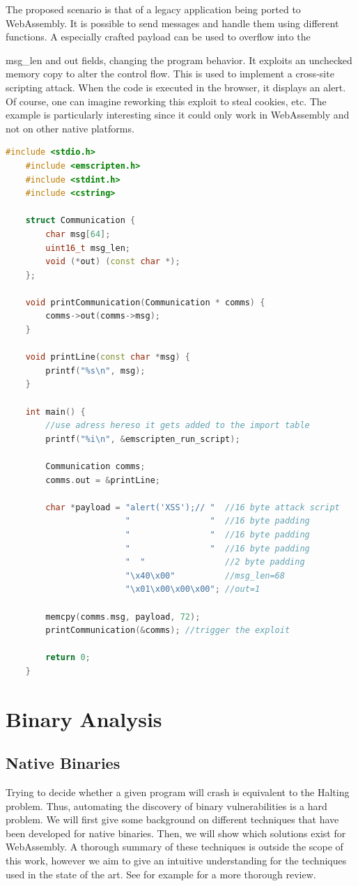 \documentclass[sigconf]{acmart}
\begin{document}
The proposed scenario is that of a legacy application being ported to WebAssembly. It is possible to send messages and handle them using different functions. A especially crafted payload can be used to overflow into the {msg\_len and out fields, changing the program behavior. It exploits an unchecked memory copy to alter the control flow. This is used to implement a cross-site scripting attack. When the code is executed in the browser, it displays an alert. Of course, one can imagine reworking this exploit to steal cookies, etc.
The example is particularly interesting since it could only work in WebAssembly and not on other native platforms.

\begin{lstlisting}[language=C++, label=fig:vuln_example_redirect_control_flow, caption={This code demonstrates a proof of concept of an exploit using indirect calls to influence control flow and implement cross site scripting. Taken with modifications from \cite{mcfadden_security_2018}}]
	#include <stdio.h>
	#include <emscripten.h>
	#include <stdint.h>
	#include <cstring>

	struct Communication {
		char msg[64];
		uint16_t msg_len;
		void (*out) (const char *);
	};

	void printCommunication(Communication * comms) {
		comms->out(comms->msg);
	}

	void printLine(const char *msg) {
		printf("%s\n", msg);
	}

	int main() {
		//use adress hereso it gets added to the import table
		printf("%i\n", &emscripten_run_script); 

		Communication comms;
		comms.out = &printLine;
		
		char *payload = "alert('XSS');// " 	//16 byte attack script
						"                " 	//16 byte padding
						"                " 	//16 byte padding
						"                " 	//16 byte padding
						"  "				//2 byte padding
						"\x40\x00"         	//msg_len=68
						"\x01\x00\x00\x00";	//out=1
						
		memcpy(comms.msg, payload, 72);
		printCommunication(&comms); //trigger the exploit
		
		return 0;
	}
\end{lstlisting}

\section{Binary Analysis}
\subsection{Native Binaries}
Trying to decide whether a given program will crash is equivalent to the Halting problem. Thus, automating the discovery of binary vulnerabilities is a hard problem. We will first give some background on different techniques that have been developed for native binaries. Then, we will show which solutions exist for WebAssembly. A thorough summary of these techniques is outside the scope of this work, however we aim to give an intuitive understanding for the techniques used in the state of the art. See for example \cite{sun_new_2018} for a more thorough review.

}
\end{document}
